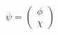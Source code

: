 \begin{equation}
\psi =\left(
\begin{array}{c}
\phi \\
\chi
\end{array}
\right)  \label{eq8a}
\end{equation}

